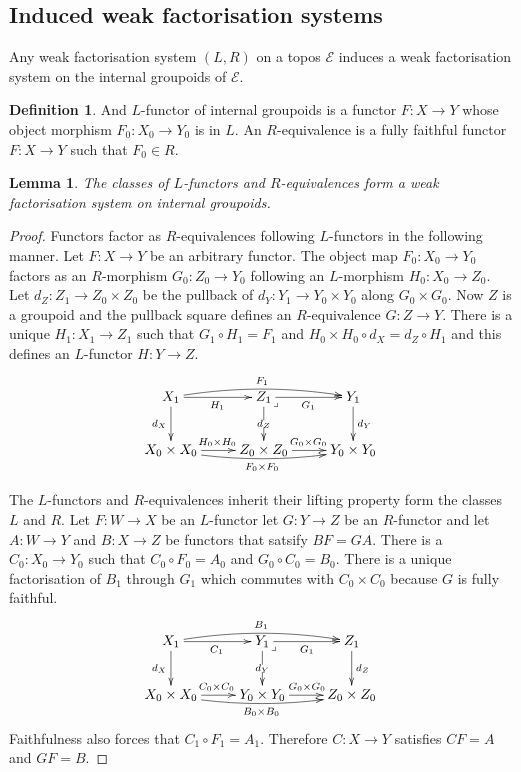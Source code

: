 \documentclass{amsart}
\theoremstyle{plain}
\newtheorem{lemma}[theorem]{Lemma}
\theoremstyle{definition}
\newtheorem{defin}[theorem]{Definition}
\newcommand\cat\mathcal
\begin{document}
\subsection{Induced weak factorisation systems}
Any weak factorisation system $(L,R)$ on a topos $\cat E$ induces a weak factorisation system on the internal groupoids of $\cat E$.

\begin{defin} And $L$-functor of internal groupoids is a functor $F:X\to Y$ whose object morphism $F_0:X_0\to Y_0$ is in $L$. An $R$-equivalence is a fully faithful functor $F:X\to Y$ such that $F_0\in R$. \end{defin}

\begin{lemma} The classes of $L$-functors and $R$-equivalences form a weak factorisation system on internal groupoids. \end{lemma}

\begin{proof} Functors factor as $R$-equivalences following $L$-functors in the following manner. Let $F:X\to Y$ be an arbitrary functor. The object map $F_0:X_0\to Y_0$ factors as an $R$-morphism $G_0:Z_0 \to Y_0$ following an $L$-morphism $H_0:X_0 \to Z_0$. Let $d_Z:Z_1 \to Z_0\times Z_0$ be the pullback of $d_Y:Y_1\to Y_0\times Y_0$ along $G_0\times G_0$. Now $Z$ is a groupoid and the pullback square defines an $R$-equivalence $G:Z\to Y$. There is a unique $H_1:X_1 \to Z_1$ such that $G_1\circ H_1 = F_1$ and $H_0\times H_0\circ d_X = d_Z\circ H_1$ and this defines an $L$-functor $H:Y\to Z$.
\[ \xymatrix{
X_1\ar[d]_{d_X}\ar[r]_{H_1}\ar@/^/[rr]^{F_1} & Z_1 \ar[r]_{G_1} \ar[d]|{d_Z}\ar@{}[dr]|<\lrcorner & Y_1\ar[d]^{d_Y}\\
X_0\times X_0 \ar[r]^{H_0\times H_0}\ar@/_/[rr]_{F_0\times F_0} & Z_0\times Z_0 \ar[r]^{G_0\times G_0} & Y_0\times Y_0 
}\]

The $L$-functors and $R$-equivalences inherit their lifting property form the classes $L$ and $R$. Let $F:W\to X$ be an $L$-functor let $G:Y\to Z$ be an $R$-functor and let $A:W\to Y$ and $B:X\to Z$ be functors that satsify $BF=GA$. There is a $C_0:X_0 \to Y_0$ such that $C_0\circ F_0 = A_0$ and $G_0\circ C_0 = B_0$. There is a unique factorisation of $B_1$ through $G_1$ which commutes with $C_0\times C_0$ because $G$ is fully faithful.
\[ \xymatrix{
X_1\ar[d]_{d_X}\ar[r]_{C_1}\ar@/^/[rr]^{B_1} & Y_1 \ar[r]_{G_1} \ar[d]|{d_Y}\ar@{}[dr]|<\lrcorner & Z_1\ar[d]^{d_Z}\\
X_0\times X_0 \ar[r]^{C_0\times C_0}\ar@/_/[rr]_{B_0\times B_0} & Y_0\times Y_0 \ar[r]^{G_0\times G_0} & Z_0\times Z_0 
}\]
Faithfulness also forces that $C_1\circ F_1 = A_1$. Therefore $C:X\to Y$ satisfies $CF=A$ and $GF=B$.
\end{proof}
\end{document}
